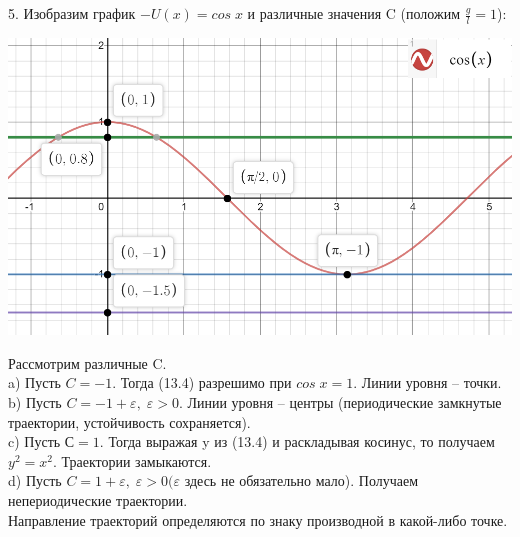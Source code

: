 \documentclass[10pt]{report}
\begin{document}
5. Изобразим график $-U(x)=cos\;x$ и различные значения C (положим $\frac g l = 1$):
\begin{center} 
{\includegraphics[scale=0.48]{graph13.3.png}} 
\end{center}
Рассмотрим различные C. \\
a) Пусть $C=-1.$ Тогда (13.4) разрешимо при $cos\;x=1$. Линии уровня -- точки. \\
b) Пусть $C=-1+\varepsilon,\; \varepsilon >0$. Линии уровня -- центры (периодические замкнутые траектории, устойчивость сохраняется).\\
c) Пусть $С=1.$ Тогда выражая y из (13.4) и раскладывая косинус, то получаем $y^2=x^2$. Траектории замыкаются.\\
d) Пусть $C=1+\varepsilon,\; \varepsilon >0 (\varepsilon$ здесь не обязательно мало). Получаем непериодические траектории.\\
Направление траекторий определяются по знаку производной в какой-либо точке. 
\end{document}
